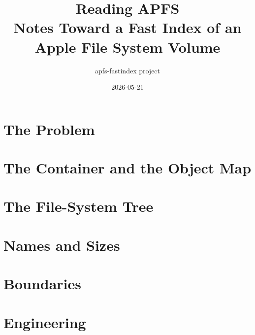 \documentclass[11pt,oneside]{book}
\title{Reading APFS\\Notes Toward a Fast Index of an Apple File System Volume}
\author{apfs-fastindex project}
\date{2026-05-21}
\begin{document}
\frontmatter
\maketitle
\tableofcontents



\mainmatter
\part{The Problem}



\part{The Container and the Object Map}



\part{The File-System Tree}




\part{Names and Sizes}



\part{Boundaries}



\part{Engineering}



\backmatter


\end{document}
